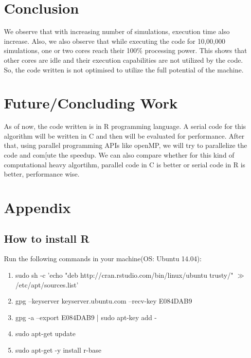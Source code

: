 \documentclass[10pt,a4paper]{article}
\begin{document}
\begin{enumerate}
\end{enumerate}

\newpage
\section{Conclusion}
We observe that with increasing number of simulations, execution time also increase. Also, we also observe that while executing the code for 10,00,000 simulations, one or two cores reach their 100\% processing power. This shows that other cores are idle and their execution capabilities are not utilized by the code. So, the code written is not optimised to utilize the full potential of the machine.

\section{Future/Concluding Work}
As of now, the code written is in R programming language. A serial code for this algorithm will be written in C and then will be evaluated for performance. After that, using parallel programming APIs like openMP, we will try to parallelize the code and com[ute the speedup. We can also compare whether for this kind of computational heavy algortihm, parallel code in C is better or serial code in R is better, performance wise. 

\section{Appendix}
\subsection{How to install R}
Run the following commands in your machine(OS: Ubuntu 14.04):
\begin{enumerate}
\item sudo sh -c 'echo "deb http://cran.rstudio.com/bin/linux/ubuntu trusty/" $\gg$ /etc/apt/sources.list'
\item gpg --keyserver keyserver.ubuntu.com --recv-key E084DAB9
\item gpg -a --export E084DAB9 | sudo apt-key add -
\item sudo apt-get update
\item sudo apt-get -y install r-base
\end{enumerate}
\end{document}
